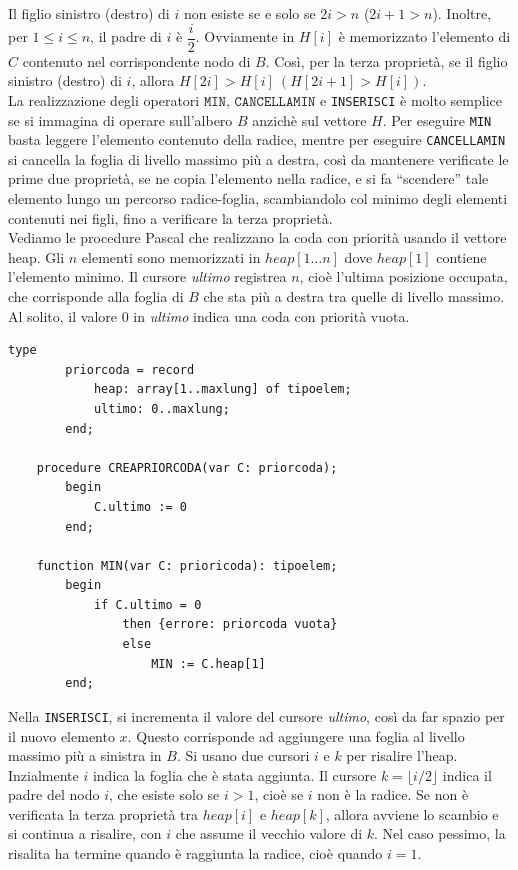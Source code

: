 \documentclass[12pt]{report}
\begin{document}
  	Il figlio sinistro (destro) di $i$ non esiste se e solo se $2i > n$ ($2i + 1 > n$). Inoltre, per $1 \leq i \leq n$, il padre di $i$ è $\dfrac{i}{2}$. Ovviamente in $H[i]$ è memorizzato l'elemento di $C$ contenuto nel corrispondente nodo di $B$. Così, per la terza proprietà, se il figlio sinistro (destro) di $i$, allora $H[2i] > H[i]\ (H[2i+1] > H[i])$. \\
  	La realizzazione degli operatori $\texttt{MIN, CANCELLAMIN}$ e \texttt{INSERISCI} è molto semplice se si immagina di operare sull'albero $B$ anzichè sul vettore $H$. Per eseguire \texttt{MIN} basta leggere l'elemento contenuto della radice, mentre per eseguire \texttt{CANCELLAMIN} si cancella la foglia di livello massimo più a destra, così da mantenere verificate le prime due proprietà, se ne copia l'elemento nella radice, e si fa ``scendere'' tale elemento lungo un percorso radice-foglia, scambiandolo col minimo degli elementi contenuti nei figli, fino a verificare la terza proprietà. \\
  	Vediamo le procedure Pascal che realizzano la coda con priorità usando il vettore heap. Gli $n$ elementi sono memorizzati in $heap[1\dots n]$ dove $heap[1]$ contiene l'elemento minimo. Il cursore \textit{ultimo} registrea $n$, cioè l'ultima posizione occupata, che corrisponde alla foglia di $B$ che sta più a destra tra quelle di livello massimo. Al solito, il valore 0 in \textit{ultimo} indica una coda con priorità vuota.
  	\begin{lstlisting}[style=pascalstyle]
  	type
  		priorcoda = record
  			heap: array[1..maxlung] of tipoelem;
  			ultimo: 0..maxlung;
  		end;

  	procedure CREAPRIORCODA(var C: priorcoda);
  		begin
  			C.ultimo := 0
  		end;

  	function MIN(var C: prioricoda): tipoelem;
  		begin
  			if C.ultimo = 0
  				then {errore: priorcoda vuota}
  				else
  					MIN := C.heap[1]
  		end;
  	\end{lstlisting}
  	Nella \texttt{INSERISCI}, si incrementa il valore del cursore \textit{ultimo}, così da far spazio per il nuovo elemento $x$. Questo corrisponde ad aggiungere una foglia al livello massimo più a sinistra in $B$. Si usano due cursori $i$ e $k$ per risalire l'heap. Inzialmente $i$ indica la foglia che è stata aggiunta. Il cursore $k = \lfloor i/2 \rfloor$ indica il padre del nodo $i$, che esiste solo se $i > 1$, cioè se $i$ non è la radice. Se non è verificata la terza proprietà tra $heap[i]$ e $heap[k]$, allora avviene lo scambio e si continua a risalire, con $i$ che assume il vecchio valore di $k$. Nel caso pessimo, la risalita ha termine quando è raggiunta la radice, cioè quando $i = 1$.
\end{document}
